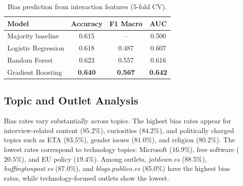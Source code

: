 \begin{table}[t]
\centering
\small
\begin{tabular}{lccc}
\toprule
\textbf{Model} & \textbf{Accuracy} & \textbf{F1 Macro} & \textbf{AUC} \\
\midrule
Majority baseline & 0.615 & -- & 0.500 \\
Logistic Regression & 0.618 & 0.487 & 0.607 \\
Random Forest & 0.623 & 0.557 & 0.616 \\
Gradient Boosting & \textbf{0.640} & \textbf{0.567} & \textbf{0.642} \\
\bottomrule
\end{tabular}
\caption{Bias prediction from interaction features (5-fold CV).}
\label{tab:models}
\end{table}

\subsection{Topic and Outlet Analysis}

Bias rates vary substantially across topics.
The highest bias rates appear for interview-related content ($85.2\%$), curiosities ($84.2\%$), and politically charged topics such as ETA ($83.5\%$), gender issues ($81.0\%$), and religion ($80.2\%$).
The lowest rates correspond to technology topics: Microsoft ($16.9\%$), free software ($20.5\%$), and EU policy ($19.4\%$).
Among outlets, \textit{jotdown.es} (88.5\%), \textit{huffingtonpost.es} (87.0\%), and \textit{blogs.publico.es} (85.0\%) have the highest bias rates, while technology-focused outlets show the lowest.
